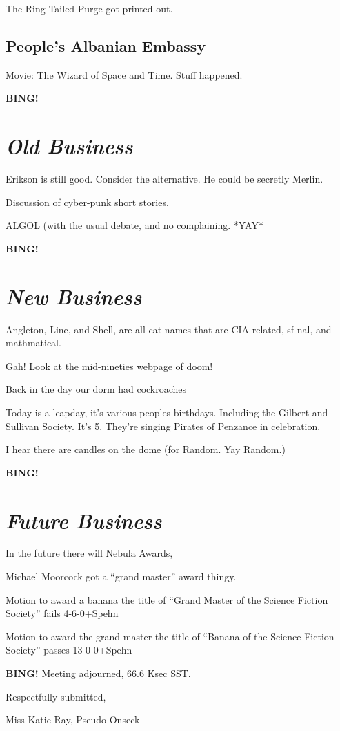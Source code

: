 \documentclass[10pt]{article}
\newcommand{\bing}{{\bf BING!} }
\newcommand{\goto}[1]{\bing \vskip 12pt \section*{{\em{#1}}}}
\begin{document}
The Ring-Tailed Purge got printed out.

\subsection{People's Albanian Embassy}

Movie: The Wizard of Space and Time.  Stuff happened.

\goto{Old Business}

Erikson is still good.  Consider the alternative.  He could be secretly Merlin.

Discussion of cyber-punk short stories.

ALGOL (with the usual debate, and no complaining.  *YAY*

\goto{New Business}

Angleton, Line, and Shell, are all cat names that are CIA related, sf-nal, and mathmatical.

Gah! Look at the mid-nineties webpage of doom!

Back in the day our dorm had cockroaches

Today is a leapday, it's various peoples birthdays.  Including the Gilbert and Sullivan Society.  It's 5.  They're singing Pirates of Penzance in celebration.

I hear there are candles on the dome (for Random.  Yay Random.)

\goto{Future Business}

In the future there will Nebula Awards, 

Michael Moorcock got a ``grand master'' award thingy.  

Motion to award a banana the title of ``Grand Master of the Science Fiction Society'' fails 4-6-0+Spehn

Motion to award the grand master the title of ``Banana of the Science Fiction Society'' passes 13-0-0+Spehn

\bing
\noindent
Meeting adjourned, 66.6 Ksec SST.

\vspace{18pt}

\centerline{Respectfully submitted,}
\centerline{Miss Katie Ray, Pseudo-Onseck}
\end{document}

